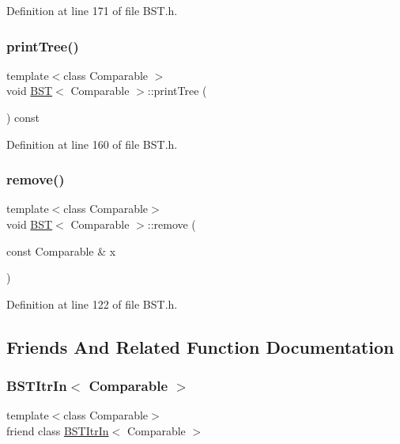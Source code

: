 Definition at line 171 of file B\+S\+T.\+h.

\hypertarget{class_b_s_t_a91e830925c48040d4c4dbb7d971c3bfe}{}\label{class_b_s_t_a91e830925c48040d4c4dbb7d971c3bfe} 
\subsubsection{\texorpdfstring{print\+Tree()}{printTree()}}
{\footnotesize\ttfamily template$<$class Comparable $>$ \\
void \hyperlink{class_b_s_t}{B\+ST}$<$ Comparable $>$\+::print\+Tree (\begin{DoxyParamCaption}{ }\end{DoxyParamCaption}) const}



Definition at line 160 of file B\+S\+T.\+h.

\hypertarget{class_b_s_t_a6f01a0b44daf82a42022b6eb4c0df7a2}{}\label{class_b_s_t_a6f01a0b44daf82a42022b6eb4c0df7a2} 
\subsubsection{\texorpdfstring{remove()}{remove()}}
{\footnotesize\ttfamily template$<$class Comparable$>$ \\
void \hyperlink{class_b_s_t}{B\+ST}$<$ Comparable $>$\+::remove (\begin{DoxyParamCaption}\item[{const Comparable \&}]{x }\end{DoxyParamCaption})}



Definition at line 122 of file B\+S\+T.\+h.



\subsection{Friends And Related Function Documentation}
\hypertarget{class_b_s_t_aab3993acac2ab24a0b59edb0c3acc775}{}\label{class_b_s_t_aab3993acac2ab24a0b59edb0c3acc775} 
\subsubsection{\texorpdfstring{B\+S\+T\+Itr\+In$<$ Comparable $>$}{BSTItrIn< Comparable >}}
{\footnotesize\ttfamily template$<$class Comparable$>$ \\
friend class \hyperlink{class_b_s_t_itr_in}{B\+S\+T\+Itr\+In}$<$ Comparable $>$\hspace{0.3cm}{\ttfamily [friend]}}



